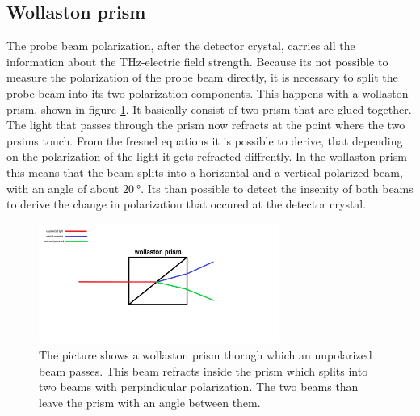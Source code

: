 \subsection{Wollaston prism}
\label{sec:wollaston}
The probe beam polarization, after the detector crystal, carries all the information about the $\si{\tera\hertz}$-electric field strength.
Because its not possible to measure the polarization of the probe beam directly, it is necessary to split the probe beam into its two polarization components.
This happens with a wollaston prism, shown in figure \ref{fig:wollaston}.
It basically consist of two prism that are glued together.
The light that passes through the prism now refracts at the point where the two prsims touch.
From the fresnel equations it is possible to derive, that depending on the polarization of the light it gets refracted diffrently.
In the wollaston prism this means that the beam splits into a horizontal and a vertical polarized beam, with an angle of about $\SI{20}{\degree}$.
Its than possible to detect the insenity of both beams to derive the change in polarization that occured at the detector crystal. 
\begin{figure}
    \centering
    \includegraphics[width=0.7\textwidth]{refferenced_pic/wollaston.png}
    \caption{The picture shows a wollaston prism thorugh which an unpolarized beam passes.
    This beam refracts inside the prism which splits into two beams with perpindicular polarization.
    The two beams than leave the prism with an angle between them.}
    \label{fig:wollaston}
\end{figure}
